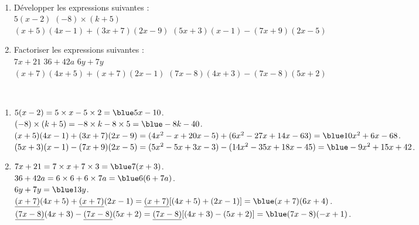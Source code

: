 \smallskip


\begin{exercice} %
\ \\ [-10mm]
   \begin{enumerate}
      \item Développer les expressions suivantes : \\
      $5(x-2)$ \hfill $(-8)\times (k+5)$ \hfill \\
      $(x+5)(4x-1) + (3x+7)(2x-9)$ \hfill $(5x+3)(x-1) -(7x+9)(2x-5)$ \hfill
      \item Factoriser les expressions suivantes : \\
      $7x+21$ \hfill $36+42 a$ \hfill $6y+7y$ \\
      $(x+7)(4x+5)+(x+7)(2x-1)$ \hspace*{4.1cm} $(7x-8)(4x+3)-(7x-8)(5x+2)$
   \end{enumerate}
\end{exercice}

\begin{corrige} 
\ \\ [-5mm]
   \begin{enumerate}
      \item $5(x-2) =5\times x-5\times2 ={\blue 5x-10}$. \\
         $(-8)\times (k+5) =-8\times k-8\times5 ={\blue -8k-40}$. \\
         $(x+5)(4x-1) + (3x+7)(2x-9) =(4x^2-x+20x-5)+(6x^2-27x+14x-63) ={\blue 10x^2+6x-68}$. \\ 
         $(5x+3)(x-1) -(7x+9)(2x-5) =(5x^2-5x+3x-3)-(14x^2-35x+18x-45) ={\blue -9x^2+15x+42}$.
      \item $7x + 21 =7\times x+7\times3 ={\blue 7(x+3)}$. \\
         $36+42 a =6\times6+6\times7a ={\blue 6(6+7a)}$. \\
         $6y+7y ={\blue 13y}$. \\
         $\underline{(x+7)}(4x+5) + \underline{(x+7)}(2x-1) =\underline{(x+7)}[(4x+5)+(2x-1)] ={\blue (x+7)(6x+4)}$. \\
         $\underline{(7x-8)}(4x+3)-\underline{(7x-8)}(5x+2) =\underline{(7x-8)}[(4x+3)-(5x+2)] ={\blue (7x-8)(-x+1)}$.
   \end{enumerate}
\end{corrige}


\bigskip


